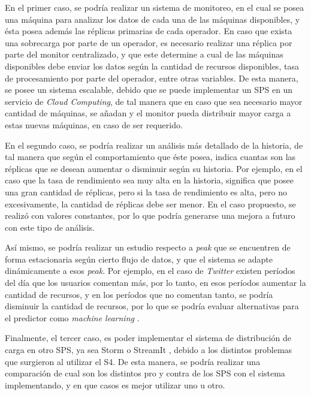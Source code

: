 En el primer caso, se podría realizar un sistema de monitoreo, en el cual se posea una máquina para analizar los datos de cada una de las máquinas disponibles, y ésta posea además las réplicas primarias de cada operador. En caso que exista una sobrecarga por parte de un operador, es necesario realizar una réplica por parte del monitor centralizado, y que este determine a cual de las máquinas disponibles debe enviar los datos según la cantidad de recursos disponibles, tasa de procesamiento por parte del operador, entre otras variables. De esta manera, se posee un sistema escalable, debido que se puede implementar un SPS en un servicio de \textit{Cloud Computing}, de tal manera que en caso que sea necesario mayor cantidad de máquinas, se añadan y el monitor pueda distribuir mayor carga a estas nuevas máquinas, en caso de ser requerido.

En el segundo caso, se podría realizar un análisis más detallado de la historia, de tal manera que según el comportamiento que éste posea, indica cuantas son las réplicas que se desean aumentar o disminuir según su historia. Por ejemplo, en el caso que la tasa de rendimiento sea muy alta en la historia, significa que posee una gran cantidad de réplicas, pero si la tasa de rendimiento es alta, pero no excesivamente, la cantidad de réplicas debe ser menor. En el caso propuesto, se realizó con valores constantes, por lo que podría generarse una mejora a futuro con este tipo de análisis.

Así mismo, se podría realizar un estudio respecto a \textit{peak} que se encuentren de forma estacionaria según cierto flujo de datos, y que el sistema se adapte dinámicamente a esos \textit{peak}. Por ejemplo, en el caso de \textit{Twitter} existen períodos del día que los usuarios comentan más, por lo tanto, en esos períodos aumentar la cantidad de recursos, y en los períodos que no comentan tanto, se podría disminuir la cantidad de recursos, por lo que se podría evaluar alternativas para el predictor como \textit{machine learning} \citep{bookMohri2012}.

Finalmente, el tercer caso, es poder implementar el sistema de distribución de carga en otro SPS, ya sea Storm \citep{stormtwitter} o StreamIt \citep{ThiesKA02}, debido a los distintos problemas que surgieron al utilizar el S4. De esta manera, se podría realizar una comparación de cual son los distintos pro y contra de los SPS con el sistema implementando, y en que casos es mejor utilizar uno u otro.